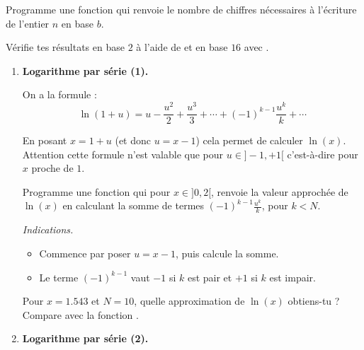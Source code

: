 \documentclass[11pt,class=report,crop=false]{standalone}
\begin{document}
\begin{activite}
\begin{enumerate}
   Programme une fonction  qui renvoie le nombre de chiffres nécessaires à l'écriture de l'entier $n$ en base $b$.
   
   Vérifie tes résultats en base $2$ à l'aide de  et en base $16$ avec .
   
   \end{enumerate}
\end{activite}






\begin{activite}


  \begin{enumerate}
    \item \textbf{Logarithme par série (1).}
    
    On a la formule :
    $$\ln(1+u) = u - \frac{u^2}{2} + \frac{u^3}{3} + \cdots + (-1)^{k-1} \frac{u^k}{k} + \cdots $$
    
    En posant $x=1+u$ (et donc $u=x-1$) cela permet de calculer $\ln(x)$. Attention cette formule n'est valable que pour $u \in ]-1,+1[$ c'est-à-dire pour $x$ proche de $1$.
    
    Programme une fonction  qui pour $x \in ]0,2[$, renvoie la valeur approchée de $\ln(x)$ en calculant la somme de termes $(-1)^{k-1} \frac{u^k}{k}$, pour $k<N$.
    
    \emph{Indications.}
    \begin{itemize}
      \item Commence par poser $u=x-1$, puis calcule la somme.
      
      \item Le terme $(-1)^{k-1}$ vaut $-1$ si $k$ est pair et $+1$ si $k$ est impair.
      
    \end{itemize}
    
    Pour $x = 1.543$ et $N=10$, quelle approximation de $\ln(x)$ obtiens-tu ? Compare avec la fonction \Python{}.
    
    \item \textbf{Logarithme par série (2).}
    

\end{enumerate}
\end{activite}
\end{document}
